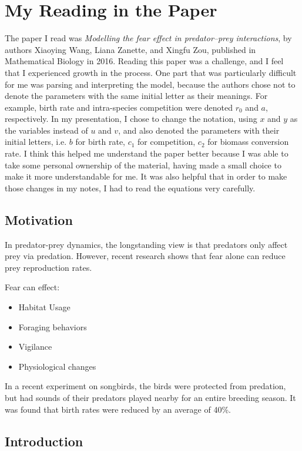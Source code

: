 \documentclass[a5paper]{article}
\theoremstyle{definition}%
\numberwithin{exercise}{section}
\theoremstyle{remark}%
\begin{document}
\section{My Reading in the Paper}
The paper I read was \emph{Modelling the fear effect in predator–prey interactions}, by authors Xiaoying Wang, Liana Zanette, and Xingfu Zou, published in Mathematical Biology in 2016. Reading this paper was a challenge, and I feel that I experienced growth in the process. One part that was particularly difficult for me was parsing and interpreting the model, because the authors chose not to denote the parameters with the same initial letter as their meanings. For example, birth rate and intra-species competition were denoted $r_0$ and $a$, respectively. In my presentation, I chose to change the notation, using $x$ and $y$ as the variables instead of $u$ and $v$, and also denoted the parameters with their initial letters, i.e. $b$ for birth rate, $c_1$ for competition, $c_2$ for biomass conversion rate.  I think this helped me understand the paper better because I was able to take some personal ownership of the material, having made a small choice to make it more understandable for me. It was also helpful that in order to make those changes in my notes, I had to read the equations very carefully. 
\subsection{Motivation}
In predator-prey dynamics, the longstanding view is that predators only affect prey via predation. However, recent research shows that fear alone can reduce prey reproduction rates.

\mbox{}

Fear can effect:
\begin{itemize}
\item Habitat Usage
\item Foraging behaviors
\item Vigilance
\item Physiological changes
\end{itemize}

In a recent experiment on songbirds, the birds were protected from predation, but had sounds of their predators played nearby for an entire breeding season. It was found that birth rates were reduced by an average of 40\%.

\subsection{Introduction}
\end{document}
